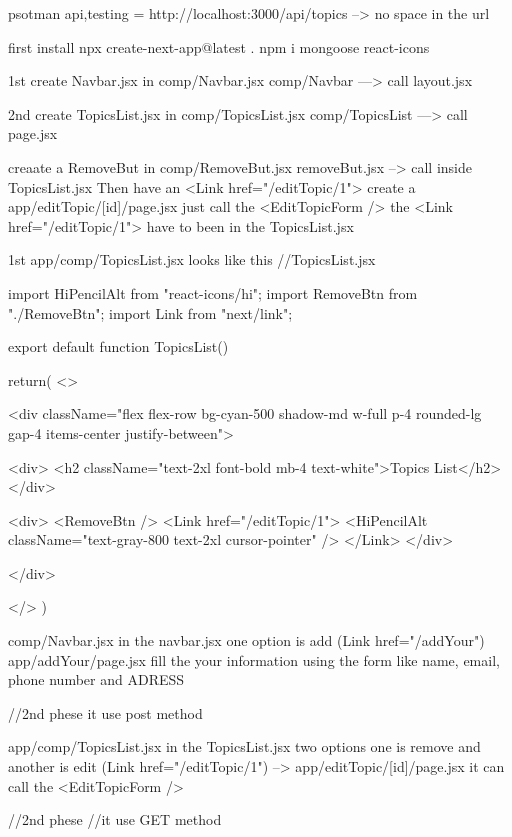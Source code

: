 psotman  api,testing = http://localhost:3000/api/topics --> no space in the url


first install 
 npx  create-next-app@latest .
npm i mongoose react-icons


1st create Navbar.jsx in comp/Navbar.jsx 
comp/Navbar --->  call layout.jsx

2nd create TopicsList.jsx in comp/TopicsList.jsx
comp/TopicsList ---> call page.jsx

creaate a RemoveBut in comp/RemoveBut.jsx
removeBut.jsx --> call inside TopicsList.jsx
Then have an  <Link href="/editTopic/1">
create a   app/editTopic/[id]/page.jsx  just call the <EditTopicForm />  
the <Link href="/editTopic/1">  have to been in the TopicsList.jsx




1st  app/comp/TopicsList.jsx looks like this
//TopicsList.jsx

import { HiPencilAlt } from "react-icons/hi";
import RemoveBtn from "./RemoveBtn";
import Link from "next/link";

export default function  TopicsList(){
    return(
         <>
          
        <div className="flex flex-row   bg-cyan-500 shadow-md  w-full p-4 rounded-lg gap-4 items-center justify-between">
             
           <div>
            <h2 className="text-2xl font-bold mb-4 text-white">Topics List</h2>
            </div>

           <div>
            <RemoveBtn />
            <Link href="/editTopic/1">
            <HiPencilAlt className="text-gray-800 text-2xl cursor-pointer" />
            </Link>
           </div>
            
         </div>

     </>
    )
}


comp/Navbar.jsx
in the navbar.jsx one  option is add (Link href="/addYour")  
app/addYour/page.jsx
fill the your information using the form  like name, email, phone number and  ADRESS 

//2nd phese
it use post method 





app/comp/TopicsList.jsx
in the TopicsList.jsx   two options one is{ remove } and another is edit (Link href="/editTopic/1")
--> app/editTopic/[id]/page.jsx
it can call the <EditTopicForm />   

//2nd phese 
//it use  GET method




